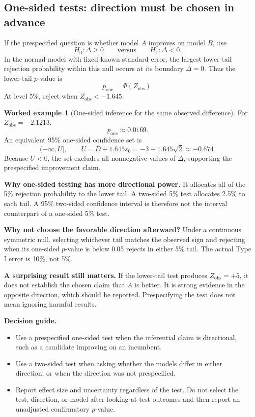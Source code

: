 \documentclass[11pt,letterpaper]{article}
\theoremstyle{definition}
\newtheorem{example}[theorem]{Worked example}
\theoremstyle{remark}
\numberwithin{equation}{section}
\begin{document}
\subsection{One-sided tests: direction must be chosen in advance}
If the prespecified question is whether model $A$ improves on model $B$, use
\[
H_0:\Delta\geq0\qquad\text{versus}\qquad H_1:\Delta<0.
\]
In the normal model with fixed known standard error, the largest lower-tail
rejection probability within this null occurs at its boundary $\Delta=0$.
Thus the lower-tail $p$-value is
\[
p_{\mathrm{one}}=\Phi(Z_{\mathrm{obs}}).
\]
At level 5\%, reject when $Z_{\mathrm{obs}}<-1.645$.

\begin{example}[One-sided inference for the same observed difference]
For $Z_{\mathrm{obs}}=-2.1213$,
\[
p_{\mathrm{one}}\approx0.0169.
\]
An equivalent 95\% one-sided confidence set is
\[
(-\infty,U],\qquad U=\bar D+1.645s_0
=-3+1.645\sqrt2\approx-0.674.
\]
Because $U<0$, the set excludes all nonnegative values of $\Delta$, supporting
the prespecified improvement claim.
\end{example}
\textbf{Why one-sided testing has more directional power.} It allocates all of
the 5\% rejection probability to the lower tail. A two-sided 5\% test allocates
2.5\% to each tail. A 95\% two-sided confidence interval is therefore not the
interval counterpart of a one-sided 5\% test.

\textbf{Why not choose the favorable direction afterward?} Under a continuous
symmetric null, selecting whichever tail matches the observed sign and rejecting
when its one-sided $p$-value is below 0.05 rejects in either 5\% tail. The actual
Type I error is 10\%, not 5\%.

\textbf{A surprising result still matters.} If the lower-tail test produces
$Z_{\mathrm{obs}}=+5$, it does not establish the chosen claim that $A$ is better.
It is strong evidence in the opposite direction, which should be reported.
Prespecifying the test does not mean ignoring harmful results.

\textbf{Decision guide.}
\begin{itemize}
\item Use a prespecified one-sided test when the inferential claim is directional,
such as a candidate improving on an incumbent.
\item Use a two-sided test when asking whether the models differ in either
direction, or when the direction was not prespecified.
\item Report effect size and uncertainty regardless of the test. Do not select
the test, direction, or model after looking at test outcomes and then report
an unadjusted confirmatory $p$-value.
\end{itemize}
\newpage
\end{document}
